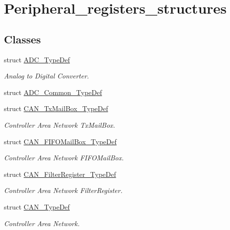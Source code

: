 \hypertarget{group___peripheral__registers__structures}{}\section{Peripheral\+\_\+registers\+\_\+structures}
\label{group___peripheral__registers__structures}
\subsection*{Classes}
\begin{DoxyCompactItemize}
\item 
struct \hyperlink{struct_a_d_c___type_def}{A\+D\+C\+\_\+\+Type\+Def}
\begin{DoxyCompactList}\small\item\em Analog to Digital Converter. \end{DoxyCompactList}\item 
struct \hyperlink{struct_a_d_c___common___type_def}{A\+D\+C\+\_\+\+Common\+\_\+\+Type\+Def}
\item 
struct \hyperlink{struct_c_a_n___tx_mail_box___type_def}{C\+A\+N\+\_\+\+Tx\+Mail\+Box\+\_\+\+Type\+Def}
\begin{DoxyCompactList}\small\item\em Controller Area Network Tx\+Mail\+Box. \end{DoxyCompactList}\item 
struct \hyperlink{struct_c_a_n___f_i_f_o_mail_box___type_def}{C\+A\+N\+\_\+\+F\+I\+F\+O\+Mail\+Box\+\_\+\+Type\+Def}
\begin{DoxyCompactList}\small\item\em Controller Area Network F\+I\+F\+O\+Mail\+Box. \end{DoxyCompactList}\item 
struct \hyperlink{struct_c_a_n___filter_register___type_def}{C\+A\+N\+\_\+\+Filter\+Register\+\_\+\+Type\+Def}
\begin{DoxyCompactList}\small\item\em Controller Area Network Filter\+Register. \end{DoxyCompactList}\item 
struct \hyperlink{struct_c_a_n___type_def}{C\+A\+N\+\_\+\+Type\+Def}
\begin{DoxyCompactList}\small\item\em Controller Area Network. \end{DoxyCompactList}\item 

\end{DoxyCompactItemize}
